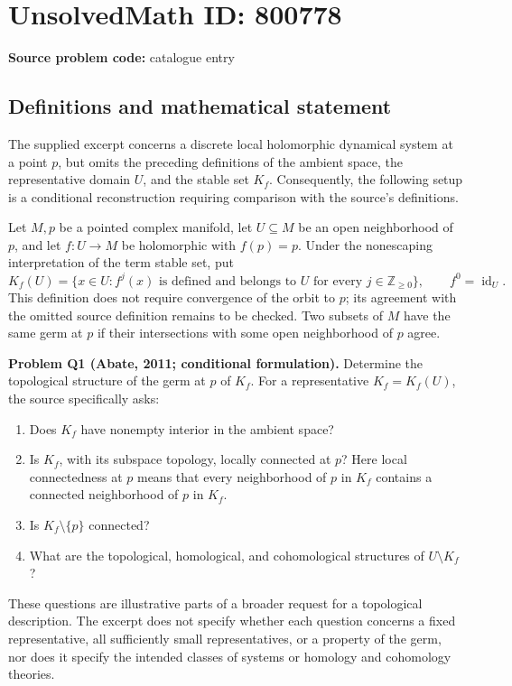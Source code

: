 \documentclass[11pt]{article}
\newcommand{\Z}{\mathbb{Z}}
\begin{document}
\section*{UnsolvedMath ID: 800778}
\textbf{Source problem code:} catalogue entry
\subsection{Definitions and mathematical statement}
The supplied excerpt concerns a discrete local holomorphic dynamical system at a point \(p\), but omits the preceding definitions of the ambient space, the representative domain \(U\), and the stable set \(K_f\). Consequently, the following setup is a conditional reconstruction requiring comparison with the source's definitions.

Let \(M,p\) be a pointed complex manifold, let \(U\subseteq M\) be an open neighborhood of \(p\), and let \(f:U\to M\) be holomorphic with \(f(p)=p\). Under the nonescaping interpretation of the term stable set, put
\[
K_f(U)=\bigl\{x\in U: f^j(x)\text{ is defined and belongs to }U\text{ for every }j\in\Z_{\geq 0}\bigr\},
\qquad f^0=\operatorname{id}_U.
\]
This definition does not require convergence of the orbit to \(p\); its agreement with the omitted source definition remains to be checked. Two subsets of \(M\) have the same germ at \(p\) if their intersections with some open neighborhood of \(p\) agree.

\textbf{Problem Q1 (Abate, 2011; conditional formulation).} Determine the topological structure of the germ at \(p\) of \(K_f\). For a representative \(K_f=K_f(U)\), the source specifically asks:
\begin{enumerate}
\item Does \(K_f\) have nonempty interior in the ambient space?
\item Is \(K_f\), with its subspace topology, locally connected at \(p\)? Here local connectedness at \(p\) means that every neighborhood of \(p\) in \(K_f\) contains a connected neighborhood of \(p\) in \(K_f\).
\item Is \(K_f\setminus\{p\}\) connected?
\item What are the topological, homological, and cohomological structures of \(U\setminus K_f\)?
\end{enumerate}
These questions are illustrative parts of a broader request for a topological description. The excerpt does not specify whether each question concerns a fixed representative, all sufficiently small representatives, or a property of the germ, nor does it specify the intended classes of systems or homology and cohomology theories.
\end{document}
